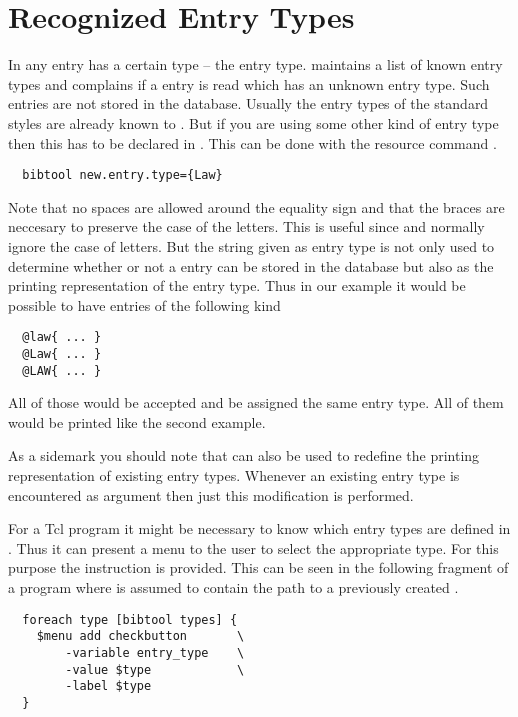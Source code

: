 \section{Recognized Entry Types}

In \BibTeX{} any entry has a certain type -- the entry type.
\BibTool{} maintains a list of known entry types and complains if a
entry is read which has an unknown entry type. Such entries are not
stored in the database. Usually the entry types of the standard
\BibTeX{} styles are already known to \BibTool. But if you are using
some other kind of entry type then this has to be declared in
\BibTool. This can be done with the resource command
.

\begin{verbatim}
  bibtool new.entry.type={Law}
\end{verbatim}

Note that no spaces are allowed around the equality sign and that the
braces are neccesary to preserve the case of the letters. This is
useful since \BibTeX{} and \BibTool{} normally ignore the case of
letters. But the string given as entry type is not only used to
determine whether or not a entry can be stored in the database but
also as the printing representation of the entry type. Thus in our
example it would be possible to have entries of the following kind

\begin{verbatim}
  @law{ ... }
  @Law{ ... }
  @LAW{ ... }
\end{verbatim}

All of those would be accepted and be assigned the same entry
type. All of them would be printed like the second example.

As a sidemark you should note that  can also be
used to redefine the printing representation of existing entry
types. Whenever an existing entry type is encountered as argument then
just this modification is performed.

For a Tcl program it might be necessary to know which entry types are
defined in \BibTool. Thus it can present a menu to the user to select
the appropriate type. For this purpose the instruction  is provided. This can be seen in the following fragment of a
program where  is assumed to contain the path to a
previously created .

\begin{verbatim}
  foreach type [bibtool types] {
    $menu add checkbutton       \
        -variable entry_type    \
        -value $type            \
        -label $type
  }
\end{verbatim}%

